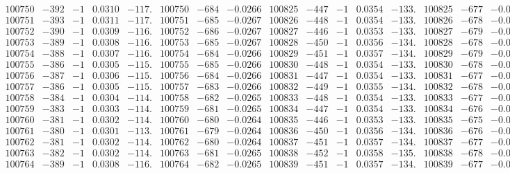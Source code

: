 \documentclass[11pt,reqno,a4letter]{article}
\numberwithin{figure}{section}
\numberwithin{table}{section}
\theoremstyle{plain}
\numberwithin{theorem}{section}
\theoremstyle{definition}
\begin{document}
\begin{table}[ht!]
\begin{equation*}
{\begin{array}{ccccc|ccc||ccccc|ccc}
100750 & -392 & -1 & 0.0310 & -117. & 100750 & -684 & -0.0266 & 100825 & -447 & -1 & 0.0354 & -133. & 100825 & -677 & -0.0263  \\
100751 & -393 & -1 & 0.0311 & -117. & 100751 & -685 & -0.0267 & 100826 & -448 & -1 & 0.0354 & -133. & 100826 & -678 & -0.0264  \\
100752 & -390 & -1 & 0.0309 & -116. & 100752 & -686 & -0.0267 & 100827 & -446 & -1 & 0.0353 & -133. & 100827 & -679 & -0.0264  \\
100753 & -389 & -1 & 0.0308 & -116. & 100753 & -685 & -0.0267 & 100828 & -450 & -1 & 0.0356 & -134. & 100828 & -678 & -0.0263  \\
100754 & -388 & -1 & 0.0307 & -116. & 100754 & -684 & -0.0266 & 100829 & -451 & -1 & 0.0357 & -134. & 100829 & -679 & -0.0264  \\
100755 & -386 & -1 & 0.0305 & -115. & 100755 & -685 & -0.0266 & 100830 & -448 & -1 & 0.0354 & -133. & 100830 & -678 & -0.0263  \\
100756 & -387 & -1 & 0.0306 & -115. & 100756 & -684 & -0.0266 & 100831 & -447 & -1 & 0.0354 & -133. & 100831 & -677 & -0.0263  \\
100757 & -386 & -1 & 0.0305 & -115. & 100757 & -683 & -0.0266 & 100832 & -449 & -1 & 0.0355 & -134. & 100832 & -678 & -0.0263  \\
100758 & -384 & -1 & 0.0304 & -114. & 100758 & -682 & -0.0265 & 100833 & -448 & -1 & 0.0354 & -133. & 100833 & -677 & -0.0263  \\
100759 & -383 & -1 & 0.0303 & -114. & 100759 & -681 & -0.0265 & 100834 & -447 & -1 & 0.0354 & -133. & 100834 & -676 & -0.0263  \\
100760 & -381 & -1 & 0.0302 & -114. & 100760 & -680 & -0.0264 & 100835 & -446 & -1 & 0.0353 & -133. & 100835 & -675 & -0.0262  \\
100761 & -380 & -1 & 0.0301 & -113. & 100761 & -679 & -0.0264 & 100836 & -450 & -1 & 0.0356 & -134. & 100836 & -676 & -0.0263  \\
100762 & -381 & -1 & 0.0302 & -114. & 100762 & -680 & -0.0264 & 100837 & -451 & -1 & 0.0357 & -134. & 100837 & -677 & -0.0263  \\
100763 & -382 & -1 & 0.0302 & -114. & 100763 & -681 & -0.0265 & 100838 & -452 & -1 & 0.0358 & -135. & 100838 & -678 & -0.0263  \\
100764 & -389 & -1 & 0.0308 & -116. & 100764 & -682 & -0.0265 & 100839 & -451 & -1 & 0.0357 & -134. & 100839 & -677 & -0.0263  \\
\end{array}
}
\end{equation*} 

\end{table}
\clearpage 
\end{document}
